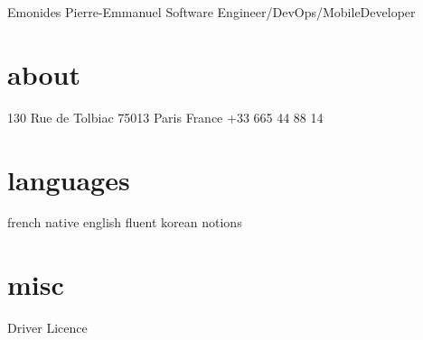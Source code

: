 \documentclass{emonides-cv}
\begin{document}
  
  {Emonides} {Pierre-Emmanuel}  {Software Engineer/DevOps/MobileDeveloper}

\begin{aside}
  \section{about}
    130 Rue de Tolbiac
    75013 Paris
    France
    +33 665 44 88 14
    ~
  \section{languages}
    french native
    english fluent
    korean notions
  \section{misc}
    Driver Licence
\end{aside}
\end{document}
